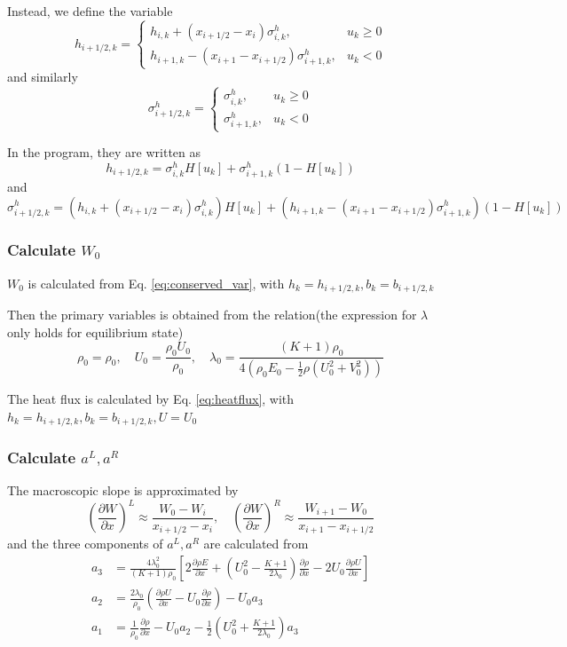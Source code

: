 \documentclass[a4paper]{book}
\begin{document}
Instead, we define the variable
$$h_{i+1/2,k} = \begin{cases} h_{i,k}+(x_{i+1/2}-x_i)\sigma_{i,k}^h, & u_k \geqslant 0\\ h_{i+1,k}-(x_{i+1}-x_{i+1/2})\sigma_{i+1,k}^h, & u_k < 0\end{cases}
$$
and similarly
$$
\sigma_{i+1/2,k}^h = \begin{cases} \sigma_{i,k}^h, & u_k \geqslant 0\\ \sigma_{i+1,k}^h, & u_k < 0\end{cases}
$$

In the program, they are written as
$$h_{i+1/2,k} =\sigma_{i,k}^h H[u_k]+\sigma_{i+1,k}^h(1-H[u_k])$$
and
$$\sigma_{i+1/2,k}^h = (h_{i,k}+(x_{i+1/2}-x_i)\sigma_{i,k}^h)H[u_k]+(h_{i+1,k}-(x_{i+1}-x_{i+1/2})\sigma_{i+1,k}^h)(1-H[u_k])$$

\subsubsection*{Calculate $W_0$}
$W_0$ is calculated from Eq. \ref{eq:conserved_var}, with $h_k=h_{i+1/2,k}, b_k=b_{i+1/2,k}$

Then the primary variables is obtained from the relation(the expression for $\lambda$ only holds for equilibrium state)
$$\rho_0 = \rho_0,\quad U_0=\frac{\rho_0 U_0}{\rho_0},\quad \lambda_0=\frac{(K+1)\rho_0}{4\left(\rho_0 E_0-\frac{1}{2}\rho(U_0^2+V_0^2)\right)}$$

The heat flux is calculated by Eq. \ref{eq:heatflux}, with $h_k=h_{i+1/2,k},b_k=b_{i+1/2,k},U=U_0$

\subsubsection*{Calculate $a^L,a^R$}
The macroscopic slope is approximated by
$$\left(\frac{\partial W}{\partial x}\right)^L\approx\frac{W_0-W_{i}}{x_{i+1/2}-x_i},\quad \left(\frac{\partial W}{\partial x}\right)^R\approx\frac{W_{i+1}-W_{0}}{x_{i+1}-x_{i+1/2}}$$
and the three components of $a^L,a^R$ are calculated from
\begin{equation} 
    \label{eq:micro_slope}
    \begin{aligned}
        a_3&=\frac{4\lambda_0^2}{(K+1)\rho_0}\left[2\frac{\partial\rho E}{\partial x}+\left(U_0^2-\frac{K+1}{2\lambda_0}\right)\frac{\partial\rho}{\partial x}-2U_0\frac{\partial\rho U}{\partial x}\right]\\
        a_2&=\frac{2\lambda_0}{\rho_0}\left(\frac{\partial\rho U}{\partial x}-U_0\frac{\partial\rho}{\partial x}\right)-U_0a_3\\
        a_1&=\frac{1}{\rho_0}\frac{\partial\rho}{\partial x}-U_0a_2-\frac{1}{2}\left(U_0^2+\frac{K+1}{2\lambda_0}\right)a_3
    \end{aligned}
\end{equation}
\end{document}
